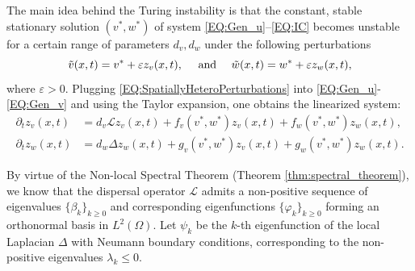 \documentclass[11pt, a4paper]{article}
\theoremstyle{break}
\theoremstyle{break}
\theoremstyle{break}
\theoremstyle{break}
\theoremstyle{break}
\theoremstyle{break}
\theoremstyle{break}
\theoremstyle{break}
\theoremstyle{break}
\begin{document}
The main idea behind the Turing instability is that the constant, stable stationary solution $(v^*, w^*)$ of system \eqref{EQ:Gen_u}--\eqref{EQ:IC} becomes unstable for a certain range of parameters $d_v, d_w$ under the following perturbations
\begin{equation}
    \label{EQ:SpatiallyHeteroPerturbations}
    \Tilde{v}(x,t) = v^* + \varepsilon z_v(x, t), \quad \text{ and } \quad \Tilde{w}(x,t) = w^* + \varepsilon z_w(x, t),
\end{equation}
where $\varepsilon > 0$. Plugging \eqref{EQ:SpatiallyHeteroPerturbations} into \eqref{EQ:Gen_u}-\eqref{EQ:Gen_v} and using the Taylor expansion, one obtains the linearized system:
\begin{align}
    \partial_t z_v(x, t) &= d_v \mathcal{L} z_v(x, t) + f_v(v^*, w^*) z_v(x, t) + f_w(v^*, w^*) z_w(x,t), \label{EQ:LinearizedKlausmeier_V}\\
    \partial_t z_w(x, t) &= d_w \Delta z_w(x, t) + g_v(v^*, w^*) z_v(x, t) + g_w(v^*, w^*) z_w(x,t). \label{EQ:LinearizedKlausmeier_W}
\end{align}

By virtue of the Non-local Spectral Theorem (Theorem \ref{thm:spectral_theorem}), we know that the dispersal operator $\mathcal{L}$ admits a non-positive sequence of eigenvalues $\{\beta_k\}_{k \geq 0}$ and corresponding eigenfunctions $\{\varphi_k\}_{k \geq 0}$ forming an orthonormal basis in $L^2(\Omega)$. Let $\psi_k$ be the $k$-th eigenfunction of the local Laplacian $\Delta$ with Neumann boundary conditions, corresponding to the non-positive eigenvalues $\lambda_k \le 0$. 
\end{document}

